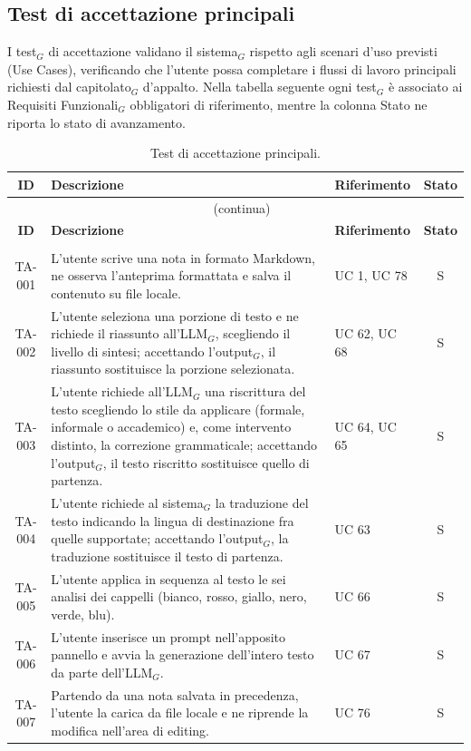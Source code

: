 \documentclass[a4paper, 10pt, colorlinks=true, linkcolor=black, urlcolor=blue, citecolor=blue, hidelinks]{article}
\begin{document}
\endgroup
\subsection{Test di accettazione principali}
I test$_G$ di accettazione validano il sistema$_G$ rispetto agli scenari d'uso previsti (Use Cases), verificando che l'utente possa completare i flussi di lavoro principali richiesti dal capitolato$_G$ d'appalto. Nella tabella seguente ogni test$_G$ è associato ai Requisiti Funzionali$_G$ obbligatori di riferimento, mentre la colonna Stato ne riporta lo stato di avanzamento.
\begingroup
\small
\renewcommand{\arraystretch}{1.25}
\begin{longtable}{|c|p{8.5cm}|>{\raggedright\arraybackslash}p{2.5cm}|c|}
\hline
\textbf{ID} & \textbf{Descrizione} & \textbf{Riferimento} & \textbf{Stato} \\
\hline
\endfirsthead
\multicolumn{4}{c}{\tablename~\thetable{}~(continua)}\\
\hline
\textbf{ID} & \textbf{Descrizione} & \textbf{Riferimento} & \textbf{Stato} \\
\hline
\endhead
\endfoot
\caption{Test di accettazione principali.}\label{tab:test-accettazione-principali}\\
\endlastfoot
TA-001 & L'utente scrive una nota in formato Markdown, ne osserva l'anteprima formattata e salva il contenuto su file locale. & UC 1, UC 78 & S \\ \hline
TA-002 & L'utente seleziona una porzione di testo e ne richiede il riassunto all'LLM$_G$, scegliendo il livello di sintesi; accettando l'output$_G$, il riassunto sostituisce la porzione selezionata. & UC 62, UC 68 & S \\ \hline
TA-003 & L'utente richiede all'LLM$_G$ una riscrittura del testo scegliendo lo stile da applicare (formale, informale o accademico) e, come intervento distinto, la correzione grammaticale; accettando l'output$_G$, il testo riscritto sostituisce quello di partenza. & UC 64, UC 65 & S \\ \hline
TA-004 & L'utente richiede al sistema$_G$ la traduzione del testo indicando la lingua di destinazione fra quelle supportate; accettando l'output$_G$, la traduzione sostituisce il testo di partenza. & UC 63 & S \\ \hline
TA-005 & L'utente applica in sequenza al testo le sei analisi dei cappelli (bianco, rosso, giallo, nero, verde, blu). & UC 66 & S \\ \hline
TA-006 & L'utente inserisce un prompt nell'apposito pannello e avvia la generazione dell'intero testo da parte dell'LLM$_G$. & UC 67 & S \\ \hline
TA-007 & Partendo da una nota salvata in precedenza, l'utente la carica da file locale e ne riprende la modifica nell'area di editing. & UC 76 & S \\ \hline
\end{longtable}
\endgroup
\end{document}
